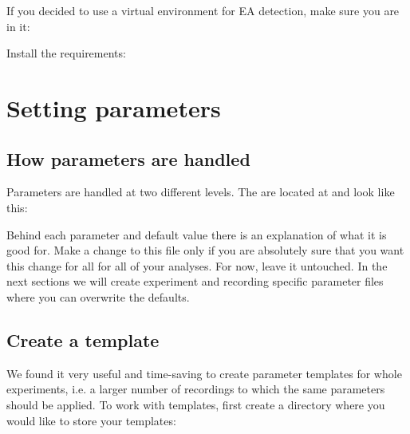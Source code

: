 \documentclass[letterpaper,10pt,english]{sphinxmanual}
\let\sphinxpxdimen\pdfpxdimen\else\newdimen\sphinxpxdimen
\begin{document}
If you decided to use a virtual environment for EA detection, make sure you are in it:

%
\begin{sphinxVerbatim}[commandchars=\\\{\}]
  
\end{sphinxVerbatim}

Install the requirements:

%
\begin{sphinxVerbatim}[commandchars=\\\{\}]
    
\end{sphinxVerbatim}


\chapter{Setting parameters}
\label{\detokenize{setting_parameters:setting-parameters}}\label{\detokenize{setting_parameters:id1}}\label{\detokenize{setting_parameters::doc}}

\section{How parameters are handled}
\label{\detokenize{setting_parameters:how-parameters-are-handled}}\label{\detokenize{setting_parameters:param-intro}}
Parameters are handled at two different levels. The  are located at
 and look like this:

\noindent{\hspace*{\fill}\sphinxincludegraphics[width=500\sphinxpxdimen]{{configAnalysis}.png}\hspace*{\fill}}

Behind each parameter and default value there is an explanation of what it is good for.
Make a change to this file only if you are absolutely sure that you want this change for all
for all of your analyses. For now, leave it untouched.
In the next sections we will create experiment and recording specific parameter files where you
can overwrite the defaults.


\section{Create a template}
\label{\detokenize{setting_parameters:create-a-template}}\label{\detokenize{setting_parameters:param-template}}
We found it very useful and time-saving to create parameter templates for whole experiments, i.e. a larger number of
recordings to which the same parameters should be applied.
To work with templates, first create a directory where you would like to store your templates:
\end{document}
